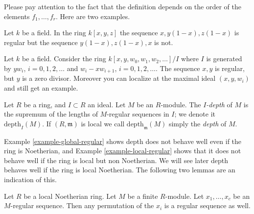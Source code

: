 \noindent
Please pay attention to the fact that the definition depends
on the order of the elements $f_1, \ldots, f_r$. Here are two
examples.

\begin{example}
\label{example-global-regular}
Let $k$ be a field. In the ring $k[x, y, z]$
the sequence $x, y(1-x), z(1-x)$ is regular
but the sequence $y(1-x), z(1-x), x$ is not.
\end{example}

\begin{example}
\label{example-local-regular}
Let $k$ be a field. Consider the ring
$k[x, y, w_0, w_1, w_2, \ldots]/I$
where $I$ is generated by $yw_i$, $i = 0, 1, 2, \ldots$ and
$w_i - xw_{i + 1}$, $i = 0, 1, 2, \ldots$.
The sequence $x, y$ is regular, but $y$ is a zero divisor.
Moreover you can localize at the maximal ideal
$(x, y, w_i)$ and still get an example.
\end{example}

\begin{definition}
\label{definition-depth}
Let $R$ be a ring, and $I \subset R$ an ideal.
Let $M$ be an $R$-module.
The {\it $I$-depth} of $M$ is the supremum of the lengths
of $M$-regular sequences in $I$; we denote it
$\text{depth}_I(M)$. If $(R, \mathfrak m)$ is
local we call $\text{depth}_{\mathfrak m}(M)$ simply
the {\it depth} of $M$.
\end{definition}

\noindent
Example \ref{example-global-regular} shows depth does not
behave well even if the ring is Noetherian, and Example
\ref{example-local-regular} shows that it does not
behave well if the ring is local but non Noetherian.
We will see later depth behaves well if the ring is local
Noetherian. The following two lemmas are an indication of this.

\begin{lemma}
\label{lemma-permute-xi}
Let $R$ be a local Noetherian ring.
Let $M$ be a finite $R$-module.
Let $x_1, \ldots, x_c$ be an $M$-regular sequence.
Then any permutation of the $x_i$ is a regular
sequence as well.
\end{lemma}

